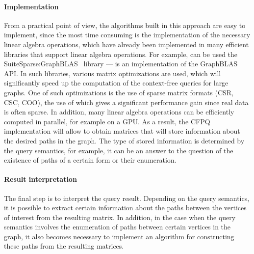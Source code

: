\documentclass[sigconf, nonacm]{acmart}
\begin{document}
\paragraph{Implementation}
From a practical point of view, the algorithms built in this approach are easy to implement, since the most time consuming is the implementation of the necessary linear algebra operations, which have already been implemented in many efficient libraries that support linear algebra operations. For example, can be used the SuiteSparse:GraphBLAS~\cite{Davis2018Algorithm9S} library --- is an implementation of the GraphBLAS API. In such libraries, various matrix optimizations are used, which will significantly speed up the computation of the context-free queries for large graphs. One of such optimizations is the use of sparse matrix formats (CSR, CSC, COO), the use of which gives a significant performance gain since real data is often sparse. In addition, many linear algebra operations can be efficiently computed in parallel, for example on a GPU. As a result, the CFPQ implementation will allow to obtain matrices that will store information about the desired paths in the graph. The type of stored information is determined by the query semantics, for example, it can be an answer to the question of the existence of paths of a certain form or their enumeration.

\paragraph{Result interpretation} 
The final step is to interpret the query result. Depending on the query semantics, it is possible to extract certain information about the paths between the vertices of interest from the resulting matrix. In addition, in the case when the query semantics involves the enumeration of paths between certain vertices in the graph, it also becomes necessary to implement an algorithm for constructing these paths from the resulting matrices.

\end{document}
